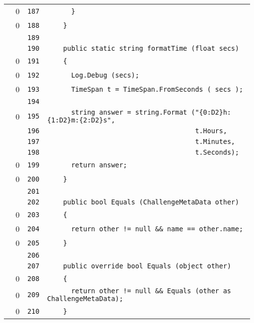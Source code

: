 \documentclass[a4paper,10pt]{article}
\begin{document}
\begin{longtable}[l]{lrrl}
\cellcolor{red} & 0 & \verb~187~ & \verb~      }~\\
\cellcolor{red} & 0 & \verb~188~ & \verb~    }~\\
\cellcolor{gray} &  & \verb~189~ & \verb~~\\
\cellcolor{gray} &  & \verb~190~ & \verb~    public static string formatTime (float secs)~\\
\cellcolor{red} & 0 & \verb~191~ & \verb~    {~\\
\cellcolor{red} & 0 & \verb~192~ & \verb~      Log.Debug (secs);~\\
\cellcolor{red} & 0 & \verb~193~ & \verb~      TimeSpan t = TimeSpan.FromSeconds ( secs );~\\
\cellcolor{gray} &  & \verb~194~ & \verb~~\\
\cellcolor{red} & 0 & \verb~195~ & \verb~      string answer = string.Format ("{0:D2}h:{1:D2}m:{2:D2}s",~\\
\cellcolor{gray} &  & \verb~196~ & \verb~                                     t.Hours,~\\
\cellcolor{gray} &  & \verb~197~ & \verb~                                     t.Minutes,~\\
\cellcolor{gray} &  & \verb~198~ & \verb~                                     t.Seconds);~\\
\cellcolor{red} & 0 & \verb~199~ & \verb~      return answer;~\\
\cellcolor{red} & 0 & \verb~200~ & \verb~    }~\\
\cellcolor{gray} &  & \verb~201~ & \verb~~\\
\cellcolor{gray} &  & \verb~202~ & \verb~    public bool Equals (ChallengeMetaData other)~\\
\cellcolor{red} & 0 & \verb~203~ & \verb~    {~\\
\cellcolor{red} & 0 & \verb~204~ & \verb~      return other != null && name == other.name;~\\
\cellcolor{red} & 0 & \verb~205~ & \verb~    }~\\
\cellcolor{gray} &  & \verb~206~ & \verb~~\\
\cellcolor{gray} &  & \verb~207~ & \verb~    public override bool Equals (object other)~\\
\cellcolor{red} & 0 & \verb~208~ & \verb~    {~\\
\cellcolor{red} & 0 & \verb~209~ & \verb~      return other != null && Equals (other as ChallengeMetaData);~\\
\cellcolor{red} & 0 & \verb~210~ & \verb~    }~\\

\end{longtable}
\end{document}
